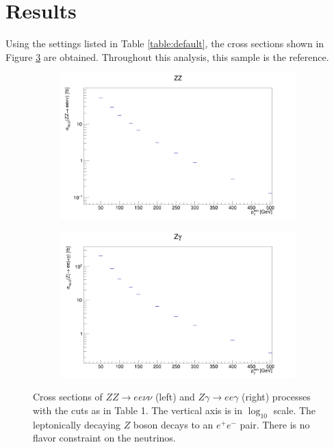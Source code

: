 \documentclass[11pt,a4paper,final]{report}
\begin{document}
\section{Results}
Using the settings listed in Table \ref{table:default}, the cross sections shown in Figure \ref{xsecs} are obtained. Throughout this analysis, this sample is the reference.
\begin{figure}[H]
\centering
	\begin{subfigure}{0.49\textwidth}
		\includegraphics[width=\linewidth]{ZZ_xsec.png}
		\caption{}
		\label{subfig:ZeeZvv}
	\end{subfigure}	
	\begin{subfigure}{0.49\textwidth}
		\includegraphics[width=\linewidth]{Zg_xsec.png}
		\caption{}
		\label{subfig:Zeeg}	
	\end{subfigure}
	\caption{Cross sections of $ZZ\to ee\nu\nu$ (left) and $Z\gamma\to ee\gamma$ (right) processes with the cuts as in Table 1. The vertical axis is in $\log_{10}$ scale. The leptonically decaying $Z$ boson decays to an $e^+e^-$ pair. There is no flavor constraint on the neutrinos.}
	\label{xsecs}
\end{figure}
\end{document}
